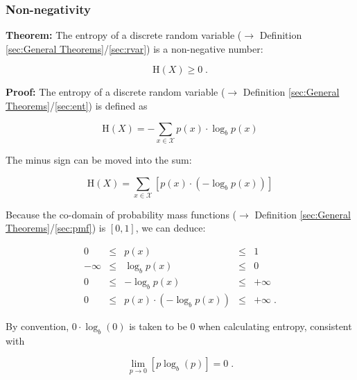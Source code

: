 \documentclass[a4paper,12pt,twoside]{book}
\begin{document}
\subsubsection[\textbf{Non-negativity}]{Non-negativity} \label{sec:ent-nonneg}
\setcounter{equation}{0}

\textbf{Theorem:} The entropy of a discrete random variable ($\rightarrow$ Definition \ref{sec:General Theorems}/\ref{sec:rvar}) is a non-negative number:

\begin{equation} \label{eq:ent-nonneg-ent-nonneg}
\mathrm{H}(X) \geq 0 \; .
\end{equation}


\vspace{1em}
\textbf{Proof:} The entropy of a discrete random variable ($\rightarrow$ Definition \ref{sec:General Theorems}/\ref{sec:ent}) is defined as

\begin{equation} \label{eq:ent-nonneg-ent}
\mathrm{H}(X) = - \sum_{x \in \mathcal{X}} p(x) \cdot \log_b p(x)
\end{equation}

The minus sign can be moved into the sum:

\begin{equation} \label{eq:ent-nonneg-ent-dev}
\mathrm{H}(X) = \sum_{x \in \mathcal{X}} \left[ p(x) \cdot \left( - \log_b p(x) \right) \right]
\end{equation}

Because the co-domain of probability mass functions ($\rightarrow$ Definition \ref{sec:General Theorems}/\ref{sec:pmf}) is $[0,1]$, we can deduce:

\begin{equation} \label{eq:ent-nonneg-nonneg}
\begin{array}{rcccl}
0 &\leq &p(x) &\leq &1 \\
-\infty &\leq &\log_b p(x) &\leq &0 \\
0 &\leq &-\log_b p(x) &\leq &+\infty \\
0 &\leq &p(x) \cdot \left(-\log_b p(x)\right) &\leq &+\infty \; .
\end{array}
\end{equation}

By convention, $0 \cdot \log_b(0)$ is taken to be $0$ when calculating entropy, consistent with

\begin{equation} \label{eq:ent-nonneg-lim-0log0}
\lim_{p \to 0} \left[ p \log_b(p) \right] = 0 \; .
\end{equation}
\end{document}
